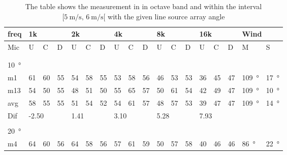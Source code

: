 \begin{table}[H]
\centering
\caption{The table shows the measurement in in octave band and within the interval $[\SI{5}{\meter\per\second},\, \SI{6}{\meter\per\second}[ $ with the given line source array angle}
\setlength\tabcolsep{5pt} %
\begin{tabular}{l|l|l|l|l|l|l|l|l|l|l|l|l|l|l|l|l|l}
freq & \multicolumn{3}{l|}{1k} & \multicolumn{3}{l|}{2k} & \multicolumn{3}{l|}{4k} & \multicolumn{3}{l|}{8k} & \multicolumn{3}{l|}{16k}   &  \multicolumn{2}{l}{Wind}                      \\ \hline
Mic  & U      & C      & D     & U      & C      & D     & U      & C      & D     & U      & C      & D     & U  & C  & D & M &S \\ \hline
 & \multicolumn{3}{l|}{} & \multicolumn{3}{l|}{} & \multicolumn{3}{l|}{} & \multicolumn{3}{l|}{} & \multicolumn{3}{l|}{} &      \multicolumn{2}{l}{}                        \\ 
 \multicolumn{18}{l}{ } \\                             
\SI{10}{\degree}   & \multicolumn{3}{l|}{} & \multicolumn{3}{l|}{} & \multicolumn{3}{l|}{} & \multicolumn{3}{l|}{} & \multicolumn{3}{l|}{}  &  \multicolumn{2}{l}{}  \\  \hline
m1   & 61     &  60    & 55    &  54    &   58   &  55   &  53    &  58    &   56  &  46    &  53    &  53   & 36 & 45 &  47 &  \SI{109}{\degree} & \SI{17}{\degree}  \\ 
m13   &  54    &  50    & 55    & 48     &  51    &  50   &  55    &  65    & 57    & 50     &  61    &  54   & 42 & 49 &  47 & \SI{109}{\degree} & \SI{10}{\degree}   \\ \hline
avg & 58     & 55     & 55   &  51    & 54     &  52   &   54   & 61     &  57   &  48    &  57    & 53    & 39 &47 & 47 & \SI{109}{\degree} & \SI{14}{\degree}   \\ \hline 
Dif & \multicolumn{3}{l|}{-2.50} & \multicolumn{3}{l|}{1.41} & \multicolumn{3}{l|}{3.10} & \multicolumn{3}{l|}{5.28} & \multicolumn{3}{l|}{7.93}  &   \multicolumn{2}{l}{}   \\ 
 \multicolumn{18}{l}{ } \\                             
\SI{20}{\degree}   & \multicolumn{3}{l|}{} & \multicolumn{3}{l|}{} & \multicolumn{3}{l|}{} & \multicolumn{3}{l|}{} & \multicolumn{3}{l|}{} &  \multicolumn{2}{l}{}   \\  \hline
m4    & 64     & 60     &  56    &   64   &  58    &  56    &   57   &   61    &  59    &  50     &   57   &  58    & 40 & 46 & 46 & \SI{86}{\degree} & \SI{22}{\degree}   \\

\end{tabular}
\end{table}
